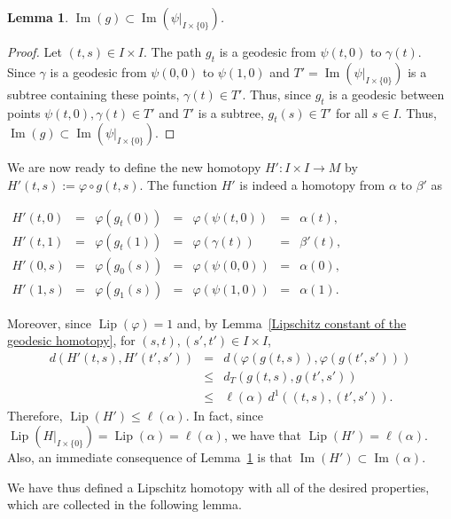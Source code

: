\documentclass{article}
\newtheorem{lemma}[theorem]{Lemma}
\theoremstyle{definition}
\theoremstyle{remark}
\def\deq{:=}
\DeclareMathOperator{\Ima}{Im}
\newcommand{\length}[1]{\ell}%
\DeclareMathOperator{\Lip}{Lip}
\begin{document}
\begin{lemma}\label{g maps into T prime} %
$\Ima(g)\subset \Ima(\psi|_{I\times\{0\}})$.
\end{lemma}
\begin{proof}
Let $(t,s)\in I\times I$. The path $g_t$ is a geodesic from $\psi(t,0)$ to $\gamma(t)$. Since $\gamma$ is a geodesic from $\psi(0,0)$ to $\psi(1,0)$ and $T'=\Ima(\psi|_{I\times\{0\}})$ is a subtree containing these points, $\gamma(t)\in T'$. Thus, since $g_t$ is a geodesic between points $\psi(t,0), \gamma(t)\in T'$ and $T'$ is a subtree, $g_t(s)\in T'$ for all $s\in I$. Thus, $\Ima(g)\subset \Ima(\psi|_{I\times\{0\}})$. 
\end{proof}

We are now ready to define the new homotopy $H':I\times I\rightarrow M$ by $H'(t,s)\deq\varphi\circ g(t,s)$. The function $H'$ is indeed a homotopy from $\alpha$ to $\beta'$ as
\begin{center}
$\begin{array}{ccccccc}
H'(t,0) & = & \varphi(g_t(0)) & = & \varphi(\psi(t,0)) & = & \alpha(t),  \\
H'(t,1) & = & \varphi(g_t(1)) & = & \varphi(\gamma(t)) & = & \beta'(t), \\
H'(0,s) & = & \varphi(g_0(s)) & = & \varphi(\psi(0,0)) & = & \alpha(0),  \\
H'(1,s) & = & \varphi(g_1(s)) & = & \varphi(\psi(1,0)) & = & \alpha(1). 
\end{array}$
\end{center}
Moreover, since $\Lip(\varphi)=1$ and, by Lemma~\ref{Lipschitz constant of the geodesic homotopy}, for $(s,t), (s',t')\in I\times I$,
\begin{eqnarray*}
d(H'(t,s), H'(t',s')) & = & d(\varphi(g(t,s)), \varphi(g(t',s'))) \\
				 & \leq & d_T(g(t,s), g(t',s')) \\
				 & \leq & \length{M}(\alpha)~d^1((t,s), (t',s')).
\end{eqnarray*}
Therefore, $\Lip(H')\leq\length{M}(\alpha)$. In fact, since $\Lip(H|_{I\times\{0\}})=\Lip(\alpha)=\length{M}(\alpha)$, we have that $\Lip(H')=\length{M}(\alpha)$. Also, an immediate consequence of Lemma~\ref{g maps into T prime} is that $\Ima(H')\subset\Ima(\alpha)$.

We have thus defined a Lipschitz homotopy with all of the desired properties, which are collected in the following lemma.
\end{document}
